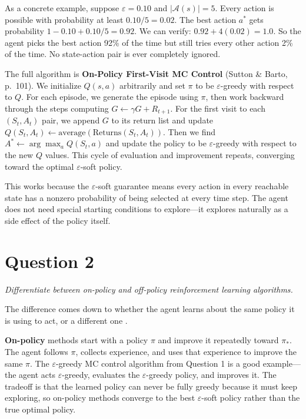 \documentclass[letterpaper]{article}
\begin{document}
As a concrete example, suppose $\varepsilon = 0.10$ and $|\mathcal{A}(s)| = 5$. Every action is possible with probability at least $0.10 / 5 = 0.02$. The best action $a^*$ gets probability $1 - 0.10 + 0.10/5 = 0.92$. We can verify: $0.92 + 4(0.02) = 1.0$. So the agent picks the best action 92\% of the time but still tries every other action 2\% of the time. No state-action pair is ever completely ignored.

The full algorithm is \textbf{On-Policy First-Visit MC Control} (Sutton \& Barto, p.\ 101). We initialize $Q(s, a)$ arbitrarily and set $\pi$ to be $\varepsilon$-greedy with respect to $Q$. For each episode, we generate the episode using $\pi$, then work backward through the steps computing $G \leftarrow \gamma G + R_{t+1}$. For the first visit to each $(S_t, A_t)$ pair, we append $G$ to its return list and update $Q(S_t, A_t) \leftarrow \text{average}(\text{Returns}(S_t, A_t))$. Then we find $A^* \leftarrow \arg\max_a Q(S_t, a)$ and update the policy to be $\varepsilon$-greedy with respect to the new $Q$ values. This cycle of evaluation and improvement repeats, converging toward the optimal $\varepsilon$-soft policy.

This works because the $\varepsilon$-soft guarantee means every action in every reachable state has a nonzero probability of being selected at every time step. The agent does not need special starting conditions to explore---it explores naturally as a side effect of the policy itself.

\section*{Question 2}
\textit{Differentiate between on-policy and off-policy reinforcement learning algorithms.}

\vspace{0.5em}

The difference comes down to whether the agent learns about the same policy it is using to act, or a different one \citep{sutton2018reinforcement}.

\textbf{On-policy} methods start with a policy $\pi$ and improve it repeatedly toward $\pi_*$. The agent follows $\pi$, collects experience, and uses that experience to improve the same $\pi$. The $\varepsilon$-greedy MC control algorithm from Question 1 is a good example---the agent acts $\varepsilon$-greedy, evaluates the $\varepsilon$-greedy policy, and improves it. The tradeoff is that the learned policy can never be fully greedy because it must keep exploring, so on-policy methods converge to the best $\varepsilon$-soft policy rather than the true optimal policy.
\end{document}
